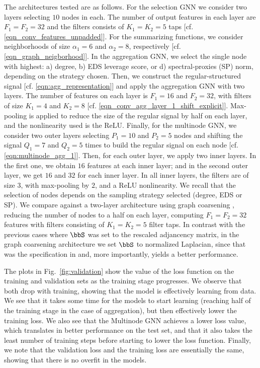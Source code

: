The architectures tested are as follows. For the selection GNN we consider two layers selecting $10$ nodes in each. The number of output features in each layer are $F_{1} = F_{2} = 32$ and the filters consists of $K_{1} = K_{2} = 5$ taps [cf. \eqref{eqn_conv_features_unpadded}]. For the summarizing functions, we consider neighborhoods of size $\alpha_{1} = 6$ and $\alpha_{2} = 8$, respectively [cf. \eqref{eqn_graph_neigborhood}]. In the aggregation GNN, we select the single node with highest: a) degree, b) EDS leverage score, or d) spectral-proxies (SP) norm, depending on the strategy chosen. Then, we construct the regular-structured signal [cf. \eqref{eqn:agg_representation}] and apply the aggregation GNN with two layers. The number of features on each layer is $F_{1}=16$ and $F_{2} = 32$, with filters of size $K_{1} = 4$ and $K_{2}=8$ [cf. \eqref{eqn_conv_agg_layer_1_shift_explicit}]. Max-pooling is applied to reduce the size of the regular signal by half on each layer, and the nonlinearity used is the ReLU. Finally, for the multinode GNN, we consider two outer layers selecting $P_{1}=10$ and $P_{2}=5$ nodes and shifting the signal $Q_{1}=7$ and $Q_{2}=5$ times to build the regular signal on each node [cf. \eqref{eqn:multinode_agg_1}]. Then, for each outer layer, we apply two inner layers. In the first one, we obtain $16$ features at each inner layer; and in the second outer layer, we get $16$ and $32$ for each inner layer. In all inner layers, the filters are of size $3$, with max-pooling by $2$, and a ReLU nonlinearity. We recall that the selection of nodes depends on the sampling strategy selected (degree, EDS or SP). We compare against a two-layer architecture using graph coarsening \cite{defferrard17-cnngraphs}, reducing the number of nodes to a half on each layer, computing $F_{1}=F_{2}=32$ features with filters consisting of $K_{1}=K_{2}=5$ filter taps. In contrast with the previous cases where $\bbS$ was set to the rescaled adjancency matrix, in the graph coarsening architecture we set $\bbS$ to normalized Laplacian, since that was the specification in \cite{defferrard17-cnngraphs} and, more importantly, yields a better performance.

The plots in Fig.~\ref{fig:validation} show the value of the loss function on the training and validation sets as the training stage progresses. We observe that both drop with training, showing that the model is effectively learning from data. We see that it takes some time for the models to start learning (reaching half of the training stage in the case of aggregation), but then effectively lower the training loss. We also see that the Multinode GNN achieves a lower loss value, which translates in better performance on the test set, and that it also takes the least number of training steps before starting to lower the loss function. Finally, we note that the validation loss and the training loss are essentially the same, showing that there is no overfit in the models.

